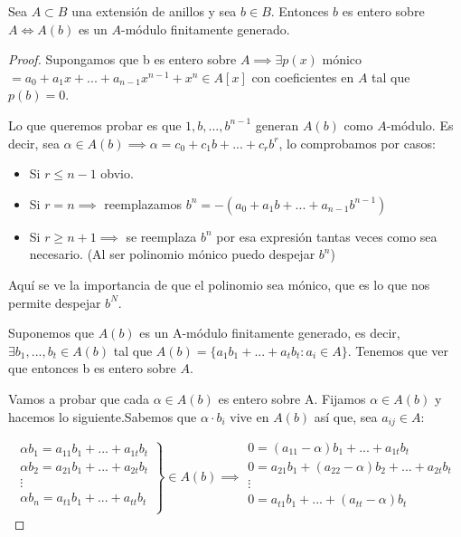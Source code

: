 \begin{prop}
	Sea $A\subset B$ una extensión de anillos y sea $b \in B$. Entonces $b$ es entero sobre $A \Leftrightarrow A(b)$ es un $A$-módulo finitamente generado.
\end{prop}

\begin{proof}
	
	\proofpart{$\implies$}
	
	Supongamos que b es entero sobre $A \implies \exists p(x)$ mónico $= a_0+a_1x+...+a_{n-1}x^{n-1}+x^n \in A[x]$ con coeficientes en $A$ tal que $p(b)=0$.
	
	Lo que queremos probar es que $1,b,...,b^{n-1}$ generan $A(b)$ como $A$-módulo. Es decir, sea $\alpha \in A(b) \implies \alpha=c_0+c_1b+...+c_rb^r$, lo comprobamos por casos:
	\begin{itemize}
		\item Si $r \leq n-1$ obvio.
		\item Si $r = n \implies$ reemplazamos $b^n=-(a_0+a_1b+...+a_{n-1}b^{n-1})$
		\item Si $r \geq n+1 \implies$ se reemplaza $b^n$ por esa expresión tantas veces como sea necesario. (Al ser polinomio mónico puedo despejar $b^n$)
	\end{itemize}
	
	Aquí se ve la importancia de que el polinomio sea mónico, que es lo que nos permite despejar $b^N$.
	
	\proofpart{$\Leftarrow$}
	
	Suponemos que $A(b)$ es un A-módulo finitamente generado, es decir, $\exists b_1,...,b_t \in A(b)$ tal que $A(b)=\{ a_1b_1+...+a_tb_t: a_i \in A \}$. Tenemos que ver que entonces b es entero sobre $A$.
	
	Vamos a probar que cada $\alpha \in A(b)$ es entero sobre A. Fijamos $\alpha \in A(b)$ y hacemos lo siguiente.Sabemos que $\alpha\cdot b_i$ vive en $A(b)$ así que,  sea $a_{ij}\in A$:
	
	\[
	\left. \begin{array}{c}
	\alpha b_1=a_{11}b_1+...+a_{1t}b_t \\
	\alpha b_2=a_{21}b_1+...+a_{2t}b_t \\
	\vdots \\
	\alpha b_n=a_{t1}b_1+...+a_{tt}b_t \\
	\end{array}
	\right\} \in A(b) \implies 
	\begin{array}{c}
	0=(a_{11}-\alpha)b_1+...+a_{1t}b_t \\
	0=a_{21}b_1+(a_{22}-\alpha)b_2+...+a_{2t}b_t \\
	\vdots \\
	0=a_{t1}b_1+...+(a_{tt}-\alpha)b_t \\
	\end{array}
	\]
	

\end{proof}
